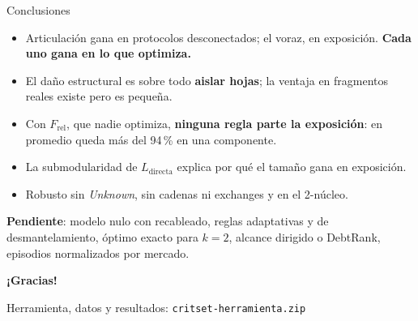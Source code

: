 \documentclass[aspectratio=169,11pt]{beamer}
\newcommand{\clave}[1]{{\color{acento}\bfseries #1}}
\begin{document}
\begin{frame}{Conclusiones}
\begin{itemize}
\item Articulación gana en protocolos desconectados; el voraz, en exposición.
      \clave{Cada uno gana en lo que optimiza.}
\item El daño estructural es sobre todo \clave{aislar hojas}; la ventaja en fragmentos reales existe pero es pequeña.
\item Con $F_{\mathrm{rel}}$, que nadie optimiza, \clave{ninguna regla parte la exposición}: en promedio queda más del 94\,\% en una componente.
\item La submodularidad de $L_{\mathrm{directa}}$ explica por qué el tamaño gana en exposición.
\item Robusto sin \emph{Unknown}, sin cadenas ni exchanges y en el 2-núcleo.
\end{itemize}
\vspace{0.5em}
\textbf{Pendiente}: modelo nulo con recableado, reglas adaptativas y de desmantelamiento,
óptimo exacto para $k=2$, alcance dirigido o DebtRank, episodios normalizados por mercado.
\end{frame}

\begin{frame}
\centering
\vfill
{\Large\bfseries ¡Gracias!}

\vspace{1em}
{\color{suave} Herramienta, datos y resultados: \texttt{critset-herramienta.zip}}
\vfill
\end{frame}
\end{document}
